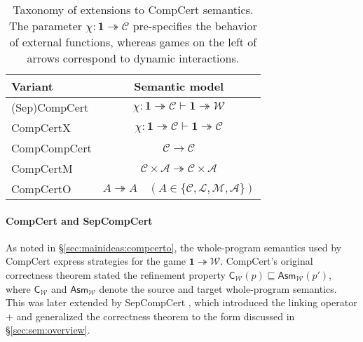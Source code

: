 \documentclass[sigplan,10pt,review,anonymous]{acmart}
\newcommand{\kw}[1]{\ensuremath{ \mathsf{#1} }}
\begin{document}
\begin{table} %
  \begin{tabular}{lc}
    \hline
    Variant & Semantic model \\
    \hline
    (Sep)CompCert \cite{compcert,sepcompcert} &
      $\chi : \mathbf{1} \twoheadrightarrow \mathcal{C}
       \vdash \mathbf{1} \twoheadrightarrow \mathcal{W}$ \\
    CompCertX \cite{popl15} &
      $\chi : \mathbf{1} \twoheadrightarrow \mathcal{C} \vdash
       \mathbf{1} \twoheadrightarrow \mathcal{C}$ \\
    CompCompCert \cite{compcompcert} &
      $\mathcal{C} \rightarrow \mathcal{C}$ \\
    CompCertM \cite{compcertm} &
      $\mathcal{C} \times \mathcal{A} \twoheadrightarrow
       \mathcal{C} \times \mathcal{A}$ \\
    CompCertO &
      $A \twoheadrightarrow A \quad
      (A \in \{\mathcal{C}, \mathcal{L}, \mathcal{M}, \mathcal{A}\})$ \\
    \hline
  \end{tabular}
  \vspace{1ex}
  \caption{Taxonomy of extensions to CompCert semantics.
    The parameter $\chi : \mathbf{1} \twoheadrightarrow \mathcal{C}$
    pre-specifies the behavior of external functions,
    whereas games on the left of arrows
    correspond to dynamic interactions.
  }
  \label{tbl:compcerts}
\end{table}

\paragraph{CompCert and SepCompCert} %

As noted in \S\ref{sec:mainideas:compcerto},
the whole-program semantics used by CompCert
express strategies for the game
$\mathbf{1} \twoheadrightarrow \mathcal{W}$.
CompCert's original correctness theorem
stated the refinement property
$\kw{C}_\mathcal{W}(p) \sqsubseteq \kw{Asm}_\mathcal{W}(p')$,
where $\kw{C}_\mathcal{W}$ and $\kw{Asm}_\mathcal{W}$
denote the source and target whole-program semantics.
This was later extended by SepCompCert \cite{sepcompcert},
which introduced the linking operator $+$
and generalized the correctness theorem to
the form discussed in \S\ref{sec:sem:overview}.
\end{document}
